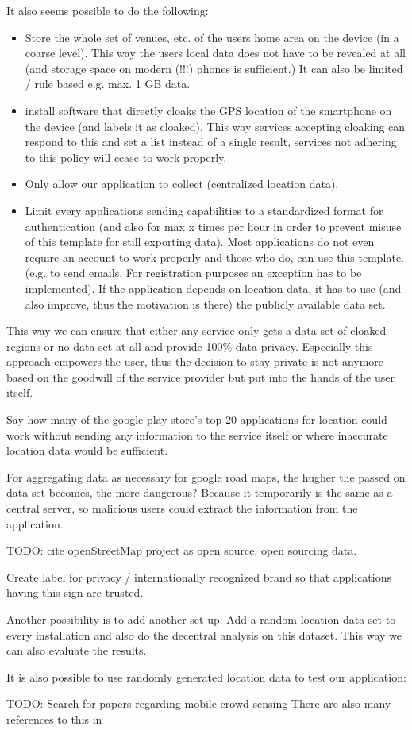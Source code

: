 It also seems possible to do the following: 
\begin{itemize}
	\item Store the whole set of venues, etc. of the users home area on the device (in a coarse level). This way the users local data does not have to be revealed at all (and storage space on modern (!!!) phones is sufficient.) It can also be limited / rule based e.g. max. 1 GB data.
	\item install software that directly cloaks the GPS location of the smartphone on the device (and labels it as cloaked). This way services accepting cloaking can respond to this and set a list instead of a single result, services not adhering to this policy will cease to work properly.
	\item Only allow our application to collect (centralized location data).
	\item Limit every applications sending capabilities to a standardized format for authentication (and also for max x times per hour in order to prevent misuse of this template for still exporting data). Most applications do not even require an account to work properly and those who do, can use this template. (e.g. to send emails. For registration purposes an exception has to be implemented). If the application depends on location data, it has to use (and also improve, thus the motivation is there) the publicly available data set.
\end{itemize}
This way we can ensure that either any service only gets a data set of cloaked regions or no data set at all and provide 100\% data privacy. Especially this approach empowers the user, thus the decision to stay private is not anymore based on the goodwill of the service provider but put into the hands of the user itself.

Say how many of the google play store's top 20 applications for location could work without sending any information to the service itself or where inaccurate location data would be sufficient.

For aggregating data as necessary for google road maps, the hugher the passed on data set becomes, the more dangerous? Because it temporarily is  the same as a central server, so malicious users could extract the information from the application.


TODO: cite openStreetMap project as open source, open sourcing data.

Create label for privacy / internationally recognized brand so that applications having this sign are trusted.

Another possibility is to add another set-up: Add a random location data-set to every installation and also do the decentral analysis on this dataset. This way we can also evaluate the results.

It is also possible to use randomly generated location data to test our application: \parencite{brinkhoff2002framework}

TODO: Search for papers regarding mobile crowd-sensing
There are also many references to this in 
\parencite{pouryazdan2017quantifying} 
